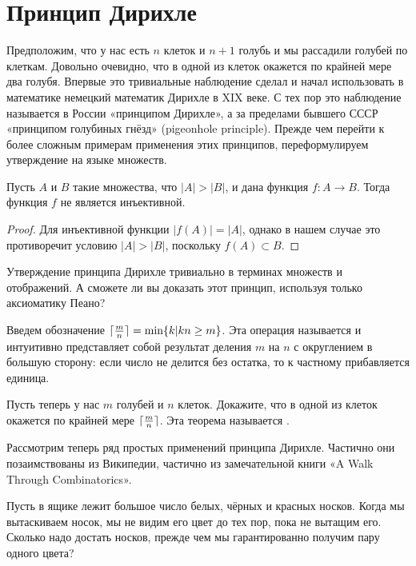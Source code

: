 \section{Принцип Дирихле}

Предположим, что у нас есть $n$ клеток и $n+1$ голубь и мы рассадили голубей по клеткам. Довольно очевидно, что в одной из клеток окажется по крайней мере два голубя. Впервые это тривиальные наблюдение сделал и начал использовать в математике немецкий математик Дирихле в XIX веке. С тех пор это наблюдение называется в России «принципом Дирихле», а за пределами бывшего СССР «принципом голубиных гнёзд» (pigeonhole principle). Прежде чем перейти к более сложным примерам применения этих принципов, переформулируем утверждение на языке множеств.

\begin{thm}
Пусть $A$ и $B$ такие множества, что $|A|>|B|$, и дана функция $f:A\to B$. Тогда функция $f$ не является инъективной.
\end{thm}
\begin{proof}
Для инъективной функции $|f(A)| = |A|$, однако в нашем случае это противоречит условию $|A|>|B|$, поскольку $f(A)\subset B$.
\end{proof}

\begin{exercise}
Утверждение принципа Дирихле тривиально в терминах множеств и отображений. А сможете ли вы доказать этот принцип, используя только аксиоматику Пеано?
\end{exercise}

Введем обозначение $\lceil {m\over n} \rceil = \min\{k|kn\ge m\}$. Эта операция называется  и интуитивно представляет собой результат деления $m$ на $n$ с округлением в большую сторону: если число не делится без остатка, то к частному прибавляется единица.

\begin{exercise}
Пусть теперь у нас $m$ голубей и $n$ клеток. Докажите, что в одной из клеток окажется по крайней мере $\lceil{m\over n}\rceil$. Эта теорема называется .
\end{exercise}

Рассмотрим теперь ряд простых применений принципа Дирихле. Частично они позаимствованы из Википедии, частично из замечательной книги «A Walk Through Combinatorics».

\begin{example}
Пусть в ящике лежит большое число белых, чёрных и красных носков. Когда мы вытаскиваем носок, мы не видим его цвет до тех пор, пока не вытащим его. Сколько надо достать носков, прежде чем мы гарантированно получим пару одного цвета?
\end{example}

